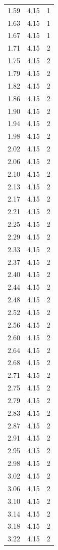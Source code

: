 \begin{longtable}{lrr}
  1.59 & 4.15 & 1 \\
  1.63 & 4.15 & 1 \\
  1.67 & 4.15 & 1 \\
  1.71 & 4.15 & 2 \\
  1.75 & 4.15 & 2 \\
  1.79 & 4.15 & 2 \\
  1.82 & 4.15 & 2 \\
  1.86 & 4.15 & 2 \\
  1.90 & 4.15 & 2 \\
  1.94 & 4.15 & 2 \\
  1.98 & 4.15 & 2 \\
  2.02 & 4.15 & 2 \\
  2.06 & 4.15 & 2 \\
  2.10 & 4.15 & 2 \\
  2.13 & 4.15 & 2 \\
  2.17 & 4.15 & 2 \\
  2.21 & 4.15 & 2 \\
  2.25 & 4.15 & 2 \\
  2.29 & 4.15 & 2 \\
  2.33 & 4.15 & 2 \\
  2.37 & 4.15 & 2 \\
  2.40 & 4.15 & 2 \\
  2.44 & 4.15 & 2 \\
  2.48 & 4.15 & 2 \\
  2.52 & 4.15 & 2 \\
  2.56 & 4.15 & 2 \\
  2.60 & 4.15 & 2 \\
  2.64 & 4.15 & 2 \\
  2.68 & 4.15 & 2 \\
  2.71 & 4.15 & 2 \\
  2.75 & 4.15 & 2 \\
  2.79 & 4.15 & 2 \\
  2.83 & 4.15 & 2 \\
  2.87 & 4.15 & 2 \\
  2.91 & 4.15 & 2 \\
  2.95 & 4.15 & 2 \\
  2.98 & 4.15 & 2 \\
  3.02 & 4.15 & 2 \\
  3.06 & 4.15 & 2 \\
  3.10 & 4.15 & 2 \\
  3.14 & 4.15 & 2 \\
  3.18 & 4.15 & 2 \\
  3.22 & 4.15 & 2 \\

\end{longtable}
